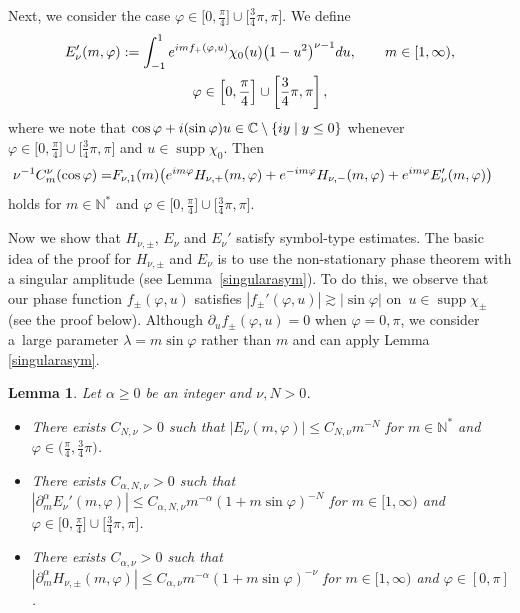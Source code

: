 \documentclass[10pt,a4paper]{article}
\numberwithin{equation}{section}
\newtheorem{Lemma}[Theorem]{Lemma}
\DeclareMathOperator{\supp}{supp}%
\def\a{\alpha}
\def\f{\varphi}
\def\l{\lambda}
\def\n{\nu}
\def\pa{\partial}
\begin{document}
Next, we consider the case $\f\in \bigl[0,\frac{\pi}{4}\bigr]\cup \bigl[\frac{3}{4}\pi,\pi\bigr]$. We define
\begin{gather*}
E_{\n}'(m,\f):=\int_{-1}^1{\rm e}^{{\rm i}mf_{+}(\f,u)}\chi_{0}(u)\bigl(1-u^2\bigr)^{\n-1}{\rm d}u,\qquad m\in [1,\infty),\\ \f\in \left[0,\frac{\pi}{4}\right]\cup \left[\frac{3}{4}\pi,\pi\right],
\end{gather*}
where we note that $\cos \f+{\rm i}(\sin\f)u\in \mathbb{C}\setminus \{{\rm i}y\mid y\leq 0\}$ whenever $\f\in \bigl[0,\frac{\pi}{4}\bigr]\cup \bigl[\frac{3}{4}\pi,\pi\bigr]$ and $u\in \supp \chi_0$. Then
\begin{align}\label{Gegendecom2}
\n^{-1}C_m^{\n}(\cos\f)=&F_{\n,1}(m)\bigl({\rm e}^{{\rm i}m\f}H_{\n,+}(m,\f)+{\rm e}^{-{\rm i}m\f}H_{\n,-}(m,\f)+{\rm e}^{{\rm i}m\f}E_{\n}'(m,\f) \bigr)
\end{align}
holds for $m\in\mathbb{N}^*$ and $\f\in \bigl[0,\frac{\pi}{4}\bigr]\cup \bigl[\frac{3}{4}\pi,\pi\bigr]$.

Now we show that $H_{\n,\pm}$, $E_{\n}$ and $E_{\n}'$ satisfy symbol-type estimates. The basic idea of the proof for $H_{\n,\pm}$ and $E_{\n}$ is to use the non-stationary phase theorem with a singular amplitude (see Lemma~\ref{singularasym}). To do this, we observe that our phase function $f_{\pm}(\f,u)$ satisfies $|f_{\pm}'(\f,u)|\gtrsim |\sin \f|$ on~${u\in \supp \chi_{\pm}}$ (see the proof below). Although $\pa_u f_{\pm}(\f,u)=0$ when $\f=0,\pi$, we consider a~large parameter $\l=m\sin \f$ rather than $m$ and can apply Lemma \ref{singularasym}.

\begin{Lemma}\label{Gegenlemma}
Let $\a\geq 0$ be an integer and $\n,N>0$.
\begin{itemize}\itemsep=0pt
\item[$(i)$] There exists $C_{N,\n}>0$ such that $|E_{\n}(m,\f)|\leq C_{N,\n}m^{-N}$ for $m\in\mathbb{N}^*$ and $\f\in \bigl(\frac{\pi}{4}, \frac{3}{4}\pi\bigr)$.

\item[$(ii)$] There exists $C_{\a,N,\n}>0$ such that $|\pa_{m}^{\a}E_{\n}'(m,\f)|\leq C_{\a,N,\n}m^{-\a}(1+m\sin\f)^{-N}$ for $m\in[1,\infty)$ and $\f\in \bigl[0,\frac{\pi}{4}\bigr]\cup \bigl[\frac{3}{4}\pi,\pi\bigr]$.

\item[$(iii)$] There exists $C_{\a,\n}>0$ such that $|\pa_{m}^{\a}H_{\n,\pm}(m,\f)|\leq C_{\a,\n}m^{-\a}(1+m\sin\f)^{-\n}$ for $m\in[1,\infty)$ and $\f\in [0,\pi]$.
\end{itemize}
\end{Lemma}
\end{document}

